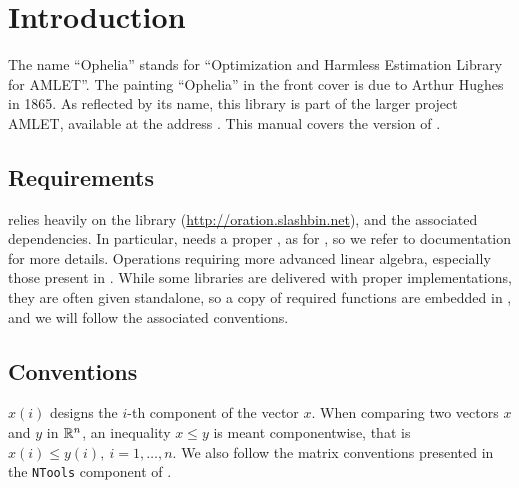 \chapter{Introduction}

The name ``Ophelia'' stands for ``Optimization and Harmless Estimation Library for AMLET''.
The painting ``Ophelia'' in the front cover is due to Arthur Hughes in 1865.
As reflected by its name, this library is part of the larger project
AMLET, available at the address \amleturl{}.
This manual covers the version \version{} of \ophelia{}.

\section{Requirements}

\ophelia{} relies heavily on the library \oratio{} (\url{http://oration.slashbin.net}), and the associated dependencies.
In particular, \ophelia needs a proper \blas{}, as for \oratio{}, so
we refer to \oratio{} documentation for more details.
Operations requiring more advanced linear algebra, especially those present in 
\lapack{}.
While some \blas{} libraries are delivered with proper \lapack implementations, they are often given standalone, so a copy of required \lapack{} functions are
embedded in \ophelia{}, and we will follow the associated conventions.

\section{Conventions}

$x(i)$ designs the $i$-th component of the vector $x$.
When comparing two vectors $x$ and $y$ in $\mathbb{R}^n$, an inequality $x \leq y$ is meant componentwise,
that is $x(i) \leq y(i),\ i = 1,\ldots,n$.
We also follow the matrix conventions presented in the \texttt{NTools} component
of \oratio{}.
